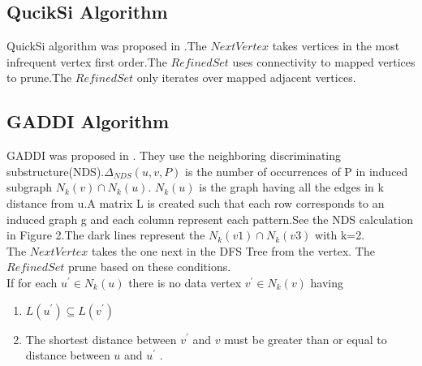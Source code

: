 \subsection{QucikSi Algorithm}
\label{sec:qsi}
\hspace{10mm}QuickSi algorithm was proposed in \cite{QSI}.The $NextVertex$ takes vertices in the most infrequent vertex first order.The $RefinedSet$ uses connectivity to mapped vertices to prune.The $RefinedSet$ only iterates over mapped adjacent vertices.
\subsection{GADDI Algorithm}
\label{sec:gaddi}
	\hspace{10mm}GADDI was proposed in \cite{GAD}. They use the neighboring discriminating substructure(NDS).$\Delta_{NDS}(u,v,P)$ is the number of occurrences of P in induced subgraph $N_k(v) \cap N_k(u)$. $N_k(u) $ is the graph having all the edges in k distance from u.A matrix L is created such that each row corresponds to an induced graph g and each column represent each pattern.See the NDS calculation in Figure 2.The dark lines represent the $N_k(v1) \cap N_k(v3)$ with k=2.
\\	\hspace{10mm}The $NextVertex$ takes the one next in the DFS Tree from  the vertex. The $RefinedSet$ prune based on these conditions.
\\	\hspace{10mm}If for each $u^{'} \in N_{k}(u)$ there is no data vertex $v^{'} \in N_{k}(v)$ having
	\begin{enumerate}
 \item $L(u^{'}) \subseteq L(v^{'})$ 
 \item The shortest distance between $v^{'}$ and $v$ must be greater than or equal to distance between $u$ and $u^{'}$ .
 \end{enumerate}
